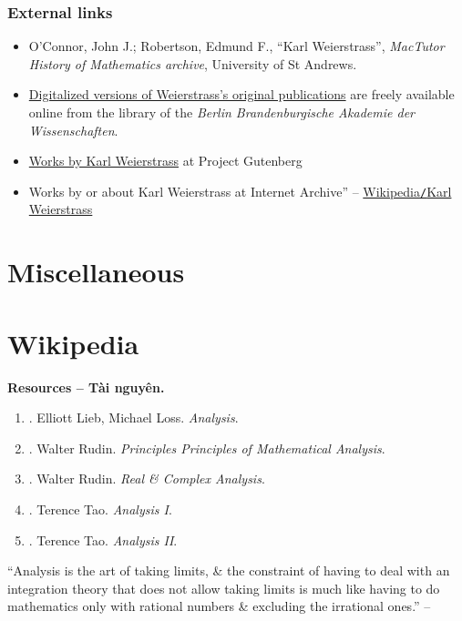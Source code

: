 \documentclass{article}
\begin{document}
\subsubsection{External links}
\begin{itemize}
	\item O'Connor, John J.; Robertson, Edmund F., ``Karl Weierstrass'', \textit{MacTutor History of Mathematics archive}, University of St Andrews.
	\item \href{http://bibliothek.bbaw.de/bibliothek-digital/digitalequellen/schriften/autoren/weierstr/}{Digitalized versions of Weierstrass's original publications} are freely available online from the library of the \textit{Berlin Brandenburgische Akademie der Wissenschaften}.
	\item \href{https://www.gutenberg.org/author/Weierstrass,+Karl}{Works by Karl Weierstrass} at Project Gutenberg
	\item Works by or about Karl Weierstrass at Internet Archive'' -- \href{https://en.wikipedia.org/wiki/Karl_Weierstrass}{Wikipedia{\tt/}Karl Weierstrass}
\end{itemize}


\section{Miscellaneous}


\appendix

\section{Wikipedia}
\textbf{\textsf{Resources -- Tài nguyên.}}
\begin{enumerate}
	\item \cite{Lieb_Loss2001}. {\sc Elliott Lieb, Michael Loss}. {\it Analysis}.
	\item \cite{Rudin1976}. {\sc Walter Rudin}. {\it Principles Principles of Mathematical Analysis}.
	\item \cite{Rudin1973,Rudin1987}. {\sc Walter Rudin}. {\it Real \& Complex Analysis}.
	\item \cite{Tao_analysis_1}. {\sc Terence Tao}. {\it Analysis I}.
	\item \cite{Tao_analysis_2}. {\sc Terence Tao}. {\it Analysis II}.
\end{enumerate}
``Analysis is the art of taking limits, \& the constraint of having to deal with an integration theory that does not allow taking limits is much like having to do mathematics only with rational numbers \& excluding the irrational ones.'' -- \cite[Chap. 1, p. 1]{Lieb_Loss2001}
\end{document}
